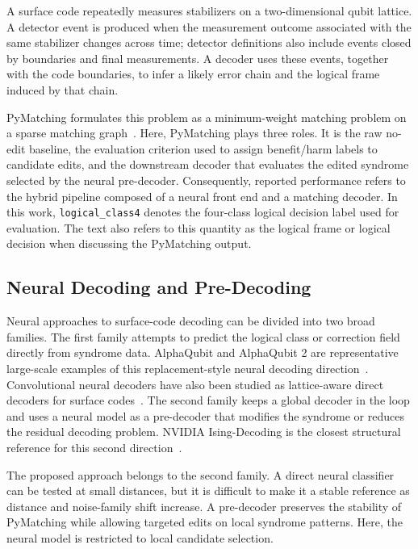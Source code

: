 \documentclass[aps,prd,12pt,twocolumn,superscriptaddress,floatfix,longbibliography]{revtex4-2}
\begin{document}
A surface code repeatedly measures stabilizers on a two-dimensional qubit
lattice. A detector event is produced when the measurement outcome associated
with the same stabilizer changes across time; detector definitions also include
events closed by boundaries and final measurements. A decoder uses these
events, together with the code boundaries, to infer a likely error chain and
the logical frame induced by that chain.

PyMatching formulates this problem as a minimum-weight matching problem on a
sparse matching graph~\cite{pymatching}. Here, PyMatching plays three roles. It
is the raw no-edit baseline, the evaluation criterion used to assign
benefit/harm labels to candidate edits, and the downstream decoder that
evaluates the edited syndrome selected by the neural pre-decoder. Consequently,
reported performance refers to the hybrid pipeline composed of a neural front
end and a matching decoder.
In this work, \texttt{logical\_class4} denotes the four-class logical
decision label used for evaluation. The text also refers to this quantity as
the logical frame or logical decision when discussing the PyMatching output.

\subsection{Neural Decoding and Pre-Decoding}

Neural approaches to surface-code decoding can be divided into two broad
families. The first family attempts to predict the logical class or correction
field directly from syndrome data. AlphaQubit and AlphaQubit 2 are
representative large-scale examples of this replacement-style neural decoding
direction~\cite{alphaqubit,alphaqubit2}. Convolutional neural decoders have
also been studied as lattice-aware direct decoders for surface
codes~\cite{convnnsurface}. The second family keeps a global decoder in the
loop and uses a neural model as a pre-decoder that modifies the syndrome or
reduces the residual decoding problem. NVIDIA Ising-Decoding is the closest
structural reference for this second direction~\cite{nvidiaising}.

The proposed approach belongs to the second family. A direct neural classifier can be
tested at small distances, but it is difficult to make it a stable reference as
distance and noise-family shift increase. A pre-decoder preserves the
stability of PyMatching while allowing targeted edits on local syndrome
patterns. Here, the neural model is restricted to local candidate selection.
\end{document}
